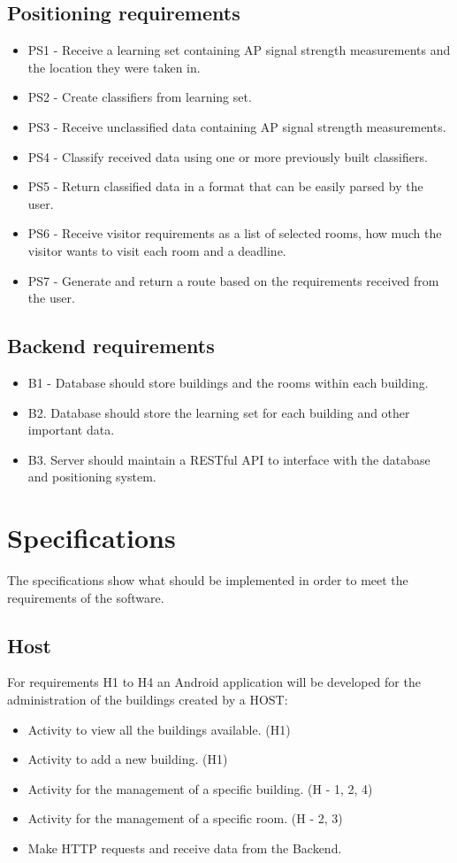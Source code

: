 \subsection{Positioning requirements}
	\begin{itemize}
		\item PS1 - Receive a learning set containing AP signal strength measurements and the 	location they were taken in.
		\item PS2 - Create classifiers from learning set.
		\item PS3 - Receive unclassified data containing AP signal strength measurements.
		\item PS4 - Classify received data using one or more previously built classifiers.
		\item PS5 - Return classified data in a format that can be easily parsed by the user.
		\item PS6 - Receive visitor requirements as a list of selected rooms, how much the visitor wants to visit each room and a deadline.
		\item PS7 - Generate and return a route based on the requirements received from the user.
	\end{itemize}

\subsection{Backend requirements}
	\begin{itemize}
		\item B1 - Database should store buildings and the rooms within each building. 
		\item B2. Database should store the learning set for each building and other important data.
		\item B3. Server should maintain a RESTful API to interface with the database and positioning 			system.
	\end{itemize}


\section{Specifications}
The specifications show what should be implemented in order to meet the requirements of the software.

\subsection{Host}
For requirements H1 to H4 an Android application will be developed for the administration of the buildings created by a HOST:
	\begin{itemize}
		\item Activity to view all the buildings available. (H1)
		\item Activity to add a new building. (H1)
		\item Activity for the management of a specific building. (H - 1, 2, 4)
		\item Activity for the management of a specific room. (H - 2, 3)
		\item Make HTTP requests and receive data from the Backend.
	\end{itemize}

